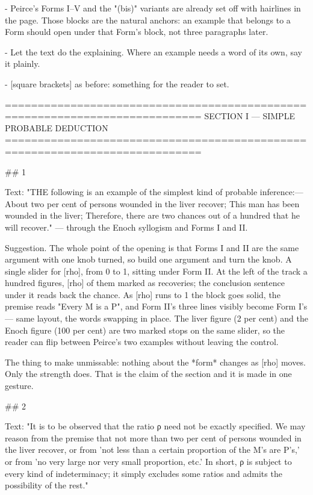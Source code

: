 - Peirce's Forms I–V and the "(bis)" variants are already set off with hairlines
  in the page. Those blocks are the natural anchors: an example that belongs to
  a Form should open under that Form's block, not three paragraphs later.

- Let the text do the explaining. Where an example needs a word of its own, say
  it plainly.

- [square brackets] as before: something for the reader to set.


============================================================================
SECTION I — SIMPLE PROBABLE DEDUCTION
============================================================================

## 1

Text: "THE following is an example of the simplest kind of probable inference:—
About two per cent of persons wounded in the liver recover; This man has been
wounded in the liver; Therefore, there are two chances out of a hundred that he
will recover." — through the Enoch syllogism and Forms I and II.

Suggestion. The whole point of the opening is that Forms I and II are the same
argument with one knob turned, so build one argument and turn the knob. A single
slider for [rho], from 0 to 1, sitting under Form II. At the left of the track a
hundred figures, [rho] of them marked as recoveries; the conclusion sentence
under it reads back the chance. As [rho] runs to 1 the block goes solid, the
premise reads "Every M is a P", and Form II's three lines visibly become Form
I's — same layout, the words swapping in place. The liver figure (2 per cent)
and the Enoch figure (100 per cent) are two marked stops on the same slider, so
the reader can flip between Peirce's two examples without leaving the control.

The thing to make unmissable: nothing about the *form* changes as [rho] moves.
Only the strength does. That is the claim of the section and it is made in one
gesture.


## 2

Text: "It is to be observed that the ratio ρ need not be exactly specified. We
may reason from the premise that not more than two per cent of persons wounded
in the liver recover, or from 'not less than a certain proportion of the M's are
P's,' or from 'no very large nor very small proportion, etc.' In short, ρ is
subject to every kind of indeterminacy; it simply excludes some ratios and
admits the possibility of the rest."

